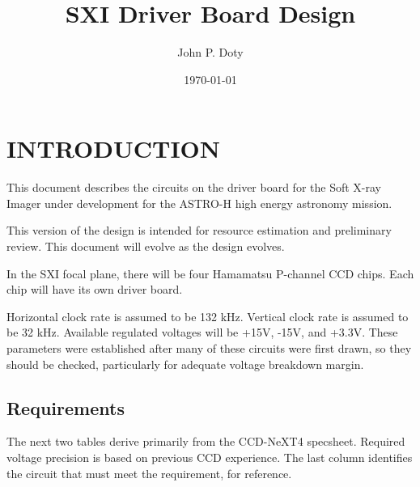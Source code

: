 \documentclass[a4paper,12pt]{article}
\author{John P. Doty}
\date{\today}
\title{SXI Driver Board Design}
\begin{document}
\begin{titlepage}
\maketitle
\end{titlepage} 

\section{INTRODUCTION}
This document describes the circuits on the driver board for the Soft X-ray Imager under development for the ASTRO-H high energy astronomy mission.

This version of the design is intended for resource estimation and preliminary review. This document will evolve as the design evolves.

In the SXI focal plane, there will be four Hamamatsu P-channel CCD chips. Each chip will have its own driver board. 

Horizontal clock rate is assumed to be 132 kHz. Vertical clock rate is assumed to be 32 kHz. Available regulated voltages will be +15V, -15V, and +3.3V. These parameters were established after many of these circuits were first drawn, so they should be checked, particularly for adequate voltage breakdown margin.

\subsection{Requirements}
The next two tables derive primarily from the CCD-NeXT4 specsheet. Required voltage precision is based on previous CCD experience. The last column identifies the circuit that must meet the requirement, for reference.
\end{document}

